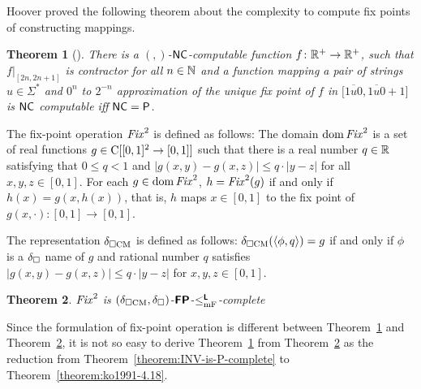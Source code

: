 \documentclass{article}
\newtheorem{theorem}{Theorem}[section]
\theoremstyle{definition}
\theoremstyle{remark}
\begin{document}
Hoover proved the following theorem about the complexity to compute fix points
of constructing mappings.

\begin{theorem}
[{\cite[Theorem 4.5]{hoover1991real}}]
\label{theorem:hoover1991-4.5}
 There is a $(, )$-$\mathsf{NC}$-computable function $f \colon \mathbb R^+ \to \mathbb R^+$,
 such that $f|_{[2n, 2n+1]}$ is contractor for all $n \in \mathbb N$ and
 a function mapping a pair of strings $u \in \Sigma^*$ and $0^n$
 to $2^{-n}$ approximation of the unique fix point of $f$
 in $\bigl[ \overline{1u0}, \overline{1u0}+1 \bigr]$ is $\mathsf{NC}$ computable
 iff $\mathsf{NC} = \mathsf{P}$.
\end{theorem}

The fix-point operation $\mathit{Fix}^2$ is defined as follows:
The domain $\mathop{\rm dom} \mathit{Fix}^2$ is a set of real functions 
$g \in \mathrm C[[0,1]^2 \to [0,1]]$ such that there is a real number $q \in \mathbb R$
satisfying that $0 \le q < 1$ and $|g(x, y) - g(x, z)| \le q \cdot |y - z|$
for all $x, y, z \in [0,1]$.
For each $g \in \mathop{\rm dom} \mathit{Fix}^2$, $h = \mathit{Fix}^2(g)$ if and only if 
$h(x) = g(x, h(x))$, that is, $h$ maps $x \in [0,1]$ to the fix point of $g(x, \cdot) \colon [0,1] \to [0,1]$.

The representation $\delta _{\square \mathrm{CM}}$ is defined as follows:
$\delta _{\square \mathrm{CM}}(\langle \phi, q \rangle) = g$ if and only if
$\phi$ is a $\delta _\square$ name of $g$ and rational number $q$ satisfies 
$|g(x, y) - g(x, z)| \le q \cdot |y - z|$ for  $x, y, z \in [0,1]$.

\begin{theorem}
 \label{theorem:Fix-is-P-complete}
 $\mathit{Fix}^2$ is $(\delta _{\square \mathrm{CM}}, \delta _\square)$-$\text{\bfseries \sffamily \upshape FP}$-$\leq _{\mathrm{mF}} ^{\text{\bfseries \sffamily \upshape L}}$-complete
\end{theorem}


Since the formulation of fix-point operation is different between 
Theorem~\ref{theorem:hoover1991-4.5} and Theorem~\ref{theorem:Fix-is-P-complete},
it is not so easy to derive Theorem~\ref{theorem:hoover1991-4.5} from
Theorem~\ref{theorem:Fix-is-P-complete} as the reduction from 
Theorem~\ref{theorem:INV-is-P-complete} to Theorem~\ref{theorem:ko1991-4.18}.
\end{document}
